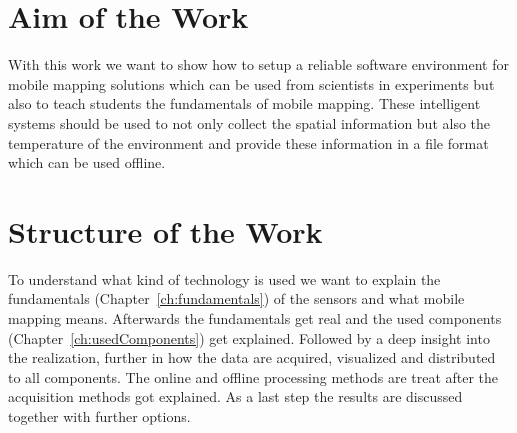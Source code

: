 \section{Aim of the Work}\label{sec:aimOfTheWork}
With this work we want to show how to setup a reliable software environment for mobile mapping solutions which can be used from scientists in experiments but also to teach students the fundamentals of mobile mapping.
These intelligent systems should be used to not only collect the spatial information but also the temperature of the environment and provide these information in a file format which can be used offline.

\section{Structure of the Work}\label{sec:structure}

To understand what kind of technology is used we want to explain the fundamentals (Chapter~\ref{ch:fundamentals}) of the sensors and what mobile mapping means.
Afterwards the fundamentals get real and the used components (Chapter~\ref{ch:usedComponents}) get explained.
Followed by a deep insight into the realization, further in how the data are acquired, visualized and distributed to all components.
The online and offline processing methods are treat after the acquisition methods got explained.
As a last step the results are discussed together with further options.
